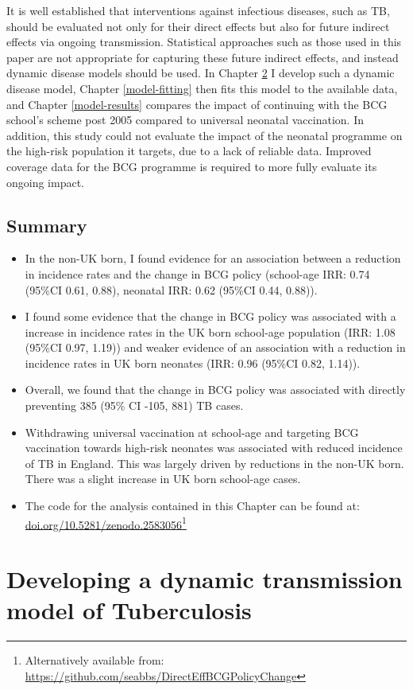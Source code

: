 \documentclass[11pt,twoside]{bristolthesis}
\begin{document}
  It is well established that interventions against infectious diseases, such as TB, should be evaluated not only for their direct effects but also for future indirect effects via ongoing transmission. Statistical approaches such as those used in this paper are not appropriate for capturing these future indirect effects, and instead dynamic disease models should be used. In Chapter \ref{model-development} I develop such a dynamic disease model, Chapter \ref{model-fitting} then fits this model to the available data, and Chapter \ref{model-results} compares the impact of continuing with the BCG school's scheme post 2005 compared to universal neonatal vaccination. In addition, this study could not evaluate the impact of the neonatal programme on the high-risk population it targets, due to a lack of reliable data. Improved coverage data for the BCG programme is required to more fully evaluate its ongoing impact.
  
  \hypertarget{summary-6}{%
  \section{Summary}\label{summary-6}}
  \begin{itemize}
  \item
    In the non-UK born, I found evidence for an association between a reduction in incidence rates and the change in BCG policy (school-age IRR: 0.74 (95\%CI 0.61, 0.88), neonatal IRR: 0.62 (95\%CI 0.44, 0.88)).
  \item
    I found some evidence that the change in BCG policy was associated with a increase in incidence rates in the UK born school-age population (IRR: 1.08 (95\%CI 0.97, 1.19)) and weaker evidence of an association with a reduction in incidence rates in UK born neonates (IRR: 0.96 (95\%CI 0.82, 1.14)).
  \item
    Overall, we found that the change in BCG policy was associated with directly preventing 385 (95\% CI -105, 881) TB cases.
  \item
    Withdrawing universal vaccination at school-age and targeting BCG vaccination towards high-risk neonates was associated with reduced incidence of TB in England. This was largely driven by reductions in the non-UK born. There was a slight increase in UK born school-age cases.
  \item
    The code for the analysis contained in this Chapter can be found at: \url{doi.org/10.5281/zenodo.2583056}\footnote{Alternatively available from: \url{https://github.com/seabbs/DirectEffBCGPolicyChange}}
  \end{itemize}
  \hypertarget{model-development}{%
  \chapter{Developing a dynamic transmission model of Tuberculosis}\label{model-development}}
  
\end{document}
